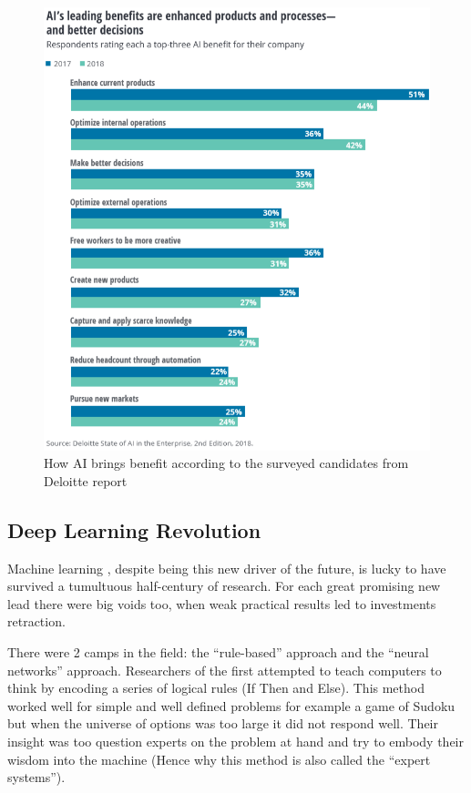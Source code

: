\begin{figure}[h]
	\centering
	\includegraphics[width=1.0\textwidth]{Cap1/AI_Deloitte2}
	\caption{How AI brings benefit according to the surveyed candidates from Deloitte report}
	\label{Deloitte2}
\end{figure}

\subsection{Deep Learning Revolution}

Machine learning , despite being this new driver of the future, is lucky to have survived a tumultuous half-century of research. For each great promising new lead there were big voids too, when weak practical results led to investments retraction.

There were 2 camps in the field: the ``rule-based'' approach and the ``neural networks'' approach. Researchers of the first attempted to teach computers to think by encoding a series of logical rules (If Then and Else). This method worked well for simple and well defined problems for example a game of Sudoku but when the universe of options was too large it did not respond well. Their insight was too question experts on the problem at hand and try to embody their wisdom into the machine (Hence why this method is also called the ``expert systems'').

